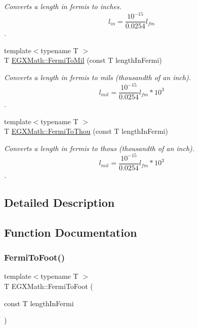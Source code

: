 \begin{DoxyCompactItemize}
\begin{DoxyCompactList}\small\item\em Converts a length in fermis to inches. \[ l_{in}= \frac{10^{-15}}{0.0254} l_{fm} \]. \end{DoxyCompactList}\item 
{\footnotesize template$<$typename T $>$ }\\T \mbox{\hyperlink{group___e_g_x_math-_conversions-_length_conversions-_non-_s_i-_fermi-_imperial_ga8559f43da08dbb3b2e09fab322904953}{E\+G\+X\+Math\+::\+Fermi\+To\+Mil}} (const T length\+In\+Fermi)
\begin{DoxyCompactList}\small\item\em Converts a length in fermis to mils (thousandth of an inch). \[ l_{mil}= \frac{10^{-15}}{0.0254} l_{fm} * 10^{3} \]. \end{DoxyCompactList}\item 
{\footnotesize template$<$typename T $>$ }\\T \mbox{\hyperlink{group___e_g_x_math-_conversions-_length_conversions-_non-_s_i-_fermi-_imperial_ga370507ab066f38bc761a2ecd2b55c670}{E\+G\+X\+Math\+::\+Fermi\+To\+Thou}} (const T length\+In\+Fermi)
\begin{DoxyCompactList}\small\item\em Converts a length in fermis to thous (thousandth of an inch). \[ l_{mil}= \frac{10^{-15}}{0.0254} l_{fm} * 10^{3} \]. \end{DoxyCompactList}\end{DoxyCompactItemize}


\subsection{Detailed Description}


\subsection{Function Documentation}
\mbox{\label{group___e_g_x_math-_conversions-_length_conversions-_non-_s_i-_fermi-_imperial_ga22e9d7b13f45ef14c3963254caff7d78}} 
\subsubsection{\texorpdfstring{Fermi\+To\+Foot()}{FermiToFoot()}}
{\footnotesize\ttfamily template$<$typename T $>$ \\
T E\+G\+X\+Math\+::\+Fermi\+To\+Foot (\begin{DoxyParamCaption}\item[{const T}]{length\+In\+Fermi }\end{DoxyParamCaption})}



